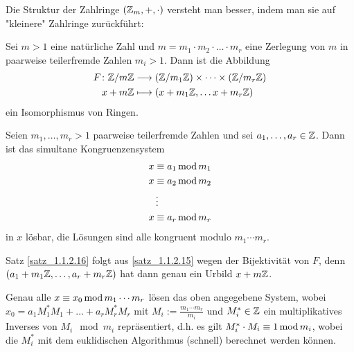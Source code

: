 Die Struktur der Zahlringe $(\mathbb{Z}_m,+,\cdot)$ versteht man besser, indem man sie auf "kleinere" Zahlringe zurückführt:

\begin{satz}
\label{satz_1.1.2.15}
	Sei $m > 1$ eine natürliche Zahl und $m = m_1 \cdot m_2 \cdot \dots \cdot m_r$ eine Zerlegung von $m$ in paarweise teilerfremde Zahlen $m_i > 1$. 
	Dann ist die Abbildung
	\begin{equation}
	\begin{aligned}
		F\colon \mathbb{Z}/m\mathbb{Z} &\longrightarrow (\mathbb{Z}/m_1\mathbb{Z}) \times \dots \times (\mathbb{Z}/m_r \mathbb{Z}) \\
		x + m\mathbb{Z} &\longmapsto (x + m_1\mathbb{Z}, \dots x + m_r \mathbb{Z})
	\end{aligned}
	\end{equation}
	ein Isomorphismus von Ringen. 
\end{satz}

\begin{satz}
\label{satz_1.1.2.16}
	Seien $m_1, \dots, m_r > 1$ paarweise teilerfremde Zahlen und sei $a_1, \dots, a_r \in \mathbb{Z}$. Dann ist das simultane Kongruenzensystem
	\begin{equation}
	\begin{aligned}
		x &\equiv a_1 \operatorname{mod} m_1 \\
		x &\equiv a_2 \operatorname{mod} m_2 \\
		&\vdots \\
		x &\equiv a_r \operatorname{mod} m_r
	\end{aligned}
	\end{equation}
	in $x$ lösbar, die Lösungen sind alle kongruent modulo $m_1 \cdots m_r$.
\end{satz}

	Satz \ref{satz_1.1.2.16} folgt aus \ref{satz_1.1.2.15} wegen der Bijektivität von $F$, denn $(a_1+m_1\mathbb{Z}, \dots, a_r+m_r\mathbb{Z})$ hat dann genau ein Urbild $x + m\mathbb{Z}$.
	
\begin{zusatz}
\label{zusatz_1.1.2.17}
	Genau alle $x \equiv x_0 \operatorname{mod} m_1 \cdots m_r$ lösen das oben angegebene System, wobei $x_0 = a_1 M_1^* M_1 + \dots + a_r M_r^* M_r$ mit $M_i := \frac{m_1 \cdots m_r}{m_i}$ und $M_i^* \in \mathbb{Z}$ ein multiplikatives Inverses von $M_i \mod m_i$ repräsentiert, d.h. es gilt $M_i^* \cdot M_i \equiv 1 \operatorname{mod} m_i$, wobei die $M_i^*$ mit dem euklidischen Algorithmus (schnell) berechnet werden können.
\end{zusatz}

